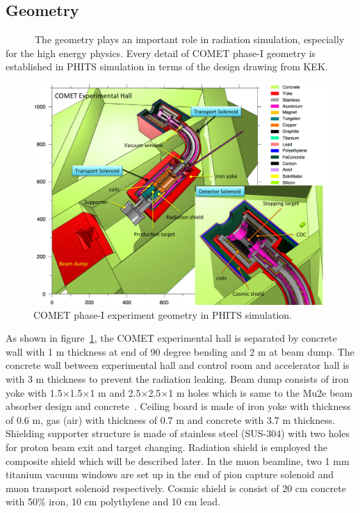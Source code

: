   \subsection{Geometry}
~~~~~~The geometry plays an important role in radiation simulation, especially for the high energy physics.
Every detail of COMET phase-I geometry is established in PHITS simulation in terms of the design drawing from KEK.
 \begin{figure}[H]
   \centering
   \includegraphics[scale=0.5]{chapter3/fig/geo.pdf}
   \caption{COMET phase-I experiment geometry in PHITS simulation.}
   \label{geom}
  \end{figure}
As shown in figure~\ref{geom}, the COMET experimental hall is separated by concrete wall with 1 m thickness at end of 90 degree bending and 2 m at beam dump.
The concrete wall between experimental hall and control room and accelerator hall is with 3 m thickness to prevent the radiation leaking.
Beam dump consists of iron yoke with 1.5$\times$1.5$\times$1 m and 2.5$\times$2.5$\times$1 m holes which is same to the Mu2e beam absorber design and concrete~\cite{mu2ereport}.
Ceiling board is made of iron yoke with thickness of 0.6 m, gas (air) with thickness of 0.7 m and concrete with 3.7 m thickness.
Shielding supporter structure is made of stainless steel (SUS-304) with two holes for proton beam exit and target changing.
Radiation shield is employed the composite shield which will be described later.
In the muon beamline, two 1 mm titanium vacuum windows are set up in the end of pion capture solenoid and muon transport solenoid respectively.
Cosmic shield is consist of 20 cm concrete with 50\% iron, 10 cm polythylene and 10 cm lead.

